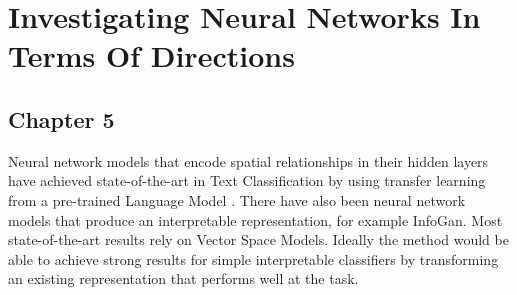 \chapter{Investigating Neural Networks In Terms Of Directions}

\section{Chapter 5}\label{chapter5}

 Neural network models that encode spatial relationships in their hidden layers have achieved state-of-the-art in Text Classification by using transfer learning from a pre-trained Language Model \cite{Gong2018}. There have also been neural network models that produce an interpretable representation, for example InfoGan.
 Most state-of-the-art results rely on Vector Space Models. Ideally the method would be able to achieve strong results for simple interpretable classifiers by transforming an existing representation that performs well at the task.
 


